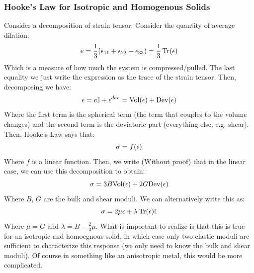 \subsubsection{Hooke's Law for Isotropic and Homogenous Solids}
Consider a decomposition of strain tensor. Consider the quantity of average dilation:
\[e = \frac{1}{3}(\epsilon_{11} + \epsilon_{22} + \epsilon_{33}) = \frac{1}{3}\Tr(\epsilon)\]
Which is a measure of how much the system is compressed/pulled. The last equality we just write the expression as the trace of the strain tensor. Then, decomposing we have:
\[\epsilon = e\mathbb{I} + \epsilon^{dev} = \text{Vol}(\epsilon) + \text{Dev}(\epsilon)\]
Where the first term is the spherical term (the term that couples to the volume changes) and the second term is the deviatoric part (everything else, e.g. shear). Then, Hooke's Law says that:
\[\sigma = f(\epsilon)\]
Where $f$ is a linear function. Then, we write (Without proof) that in the linear case, we can use this decomposition to obtain:
\[\sigma = 3B\text{Vol}(\epsilon) + 2G\text{Dev}(\epsilon)\]
Where $B$, $G$ are the bulk and shear moduli. We can alternatively write this as:
\[\sigma = 2\mu\epsilon + \lambda \Tr(\epsilon) \mathbb{I}\]
Where $\mu = G$ and $\lambda = B - \frac{2}{3}\mu$. What is important to realize is that this is true for an isotropic and homoegnous solid, in which case only two elastic moduli are sufficient to characterize this response (we only need to know the bulk and shear moduli). Of course in something like an anisotropic metal, this would be more complicated.